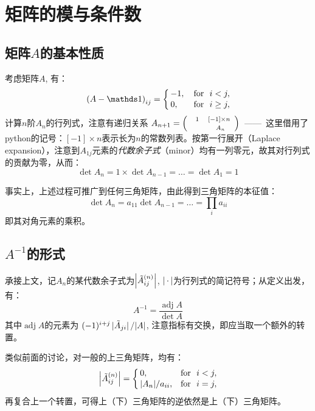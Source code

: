 \documentclass[preview,10pt,border=8pt]{standalone}
\begin{document}
\section{矩阵的模与条件数}
\subsection{矩阵$A$的基本性质}
	考虑矩阵$A$, 有：
	\begin{equation}
		\pqty{A - \idty}_{ij} =
		\bigg\lbrace
		\begin{aligned}\,
			& {-1}, \,
			&&\text{for}\ \ i < j, \\[-.5ex]
			& 0, 
			&&\text{for}\ \ i \ge j,
		\end{aligned}
	\end{equation}
	计算$n$阶$A_n$的行列式，注意有递归关系
		$ A_{n+1} = \pqty{
		 	\begin{smallmatrix}
				1 & [-1] \times n\ \\[.5ex]
				\qquad & A_{n}
		 	\end{smallmatrix}
		}$\,
	——\ 这里借用了python的记号：$[-1] \times n$表示长为$n$的常数列表。按第一行展开（Laplace expansion），注意到$A_{1j}$元素的\textit{代数余子式}（minor）均有一列零元，故其对行列式的贡献为零，从而：
	\begin{equation}
		\det A_n = 1\times\det A_{n-1}
		= \dots = \det A_1 = 1
	\end{equation}
	
	事实上，上述过程可推广到任何三角矩阵，由此得到三角矩阵的本征值：
	\begin{equation}
		\det A_n = a_{11} \det A_{n-1}
		= \dots = \prod_i a_{ii}
	\end{equation}
	即其对角元素的乘积。
\subsection{$A^{-1}$的形式}
	承接上文，记$A_n$的某代数余子式为$\abs{\tilde{A}^{(n)}_{ij}}$, $\abs{\,\cdot\,}$为行列式的简记符号；从定义出发，有：
	\begin{equation}
		A^{-1} = \frac{\operatorname{adj} A}{\det A}
	\end{equation}
	其中$\operatorname{adj} A$的元素为
		$(-1)^{i+j}\,
			\abs*{\tilde{A}_{ji}} / \abs{A}$, 
	注意指标有交换，即应当取一个额外的转置。
	
	类似前面的讨论，对一般的上三角矩阵，均有：
	\begin{equation}
		\abs{\tilde{A}^{(n)}_{ij}} =
		\bigg\lbrace
		\begin{aligned}\,
			& 0, \,
			&&\text{for}\ \ i < j, \\[-.5ex]
			& \abs{A_n} / a_{ii}, 
			&&\text{for}\ \ i = j,
		\end{aligned}
	\end{equation}
	再复合上一个转置，可得上（下）三角矩阵的逆依然是上（下）三角矩阵。
	
\end{document}
